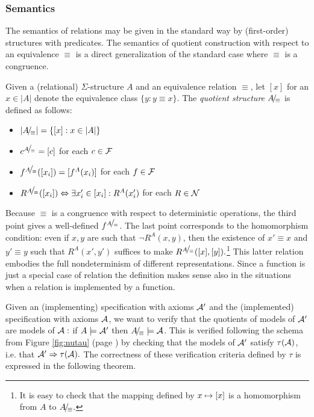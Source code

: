 \subsubsection{Semantics}
The semantics of relations may be given in the standard way by (first-order) structures with predicates. The semantics of quotient construction with respect
to
an equivalence $\equiv$ is a direct generalization of the standard case where $\equiv$ is a congruence.
\begin{DEFINITION}\label{de:relquot}
Given a (relational) $\Sigma$-structure $A$ and an equivalence relation $\equiv$, let
$[x]$ for an $x\in |A|$ denote the equivalence class $\{y:y\equiv x\}.$ The {\em quotient structure} $A\!{\textstyle /}\!_\equiv$ is defined as follows: \begin{itemize}\MyLPar
\item $|A\!{\textstyle /}\!_\equiv| = \{[x]:x\in |A|\}$ \item $c^{A\!{\textstyle /}\!_\equiv} = [c]$ for each $c\in{\cal F}$ \item $f^{A\!{\textstyle /}\!_\equiv}([x_i]) = [f^A(x_i)]$ for each $f\in{\cal F}$ \item $R^{A\!{\textstyle /}\!_\equiv}([x_i])\mathrel{\Leftrightarrow} \exists x'_i\in [x_i]: R^A(x'_i)$ for each
$R\in \cal N$
\end{itemize}
\end{DEFINITION}
\noindent Because $\equiv$ is a congruence with respect to deterministic operations, the
third point gives a well-defined $f^{A\!{\textstyle /}\!_\equiv}$. The last point corresponds
to the homomorphism condition: even if $x,y$ are such that $\neg R^A(x,y)$, then
the existence of $x'\equiv x$ and $y'\equiv y$ such that $R^A(x',y')$ suffices
to make $R^{A\!{\textstyle /}\!_\equiv}([x],[y]).$\footnote{It is easy to check that the mapping defined by $x\mathrel{\mapsto} [x]$ is a homomorphism from $A$ to $A\!{\textstyle /}\!_\equiv.$}
This latter relation embodies the full
nondeterminism of different representations. Since a function is just a special
case of relation the definition makes sense also in the situations when a relation is implemented by a function.

Given an (implementing) specification with axioms ${\cal A}'$ and the (implemented)
specification with axioms ${\cal A}$, we want to verify that the quotients of models of ${\cal A}'$ are models of ${\cal A} :$ if $A\models {\cal A}'$ then $A\!{\textstyle /}\!_\equiv\models {\cal A}$. This is verified following the schema from Figure \ref{fig:nutau} (page \pageref{'nutau'}) by checking that the models of
${\cal A}'$ satisfy $\tau({\cal A})$, i.e. that ${\cal A}'\mathrel\Rightarrow\tau({\cal A}).$ The correctness of these verification criteria defined by $\tau$ is expressed in the following theorem. 

